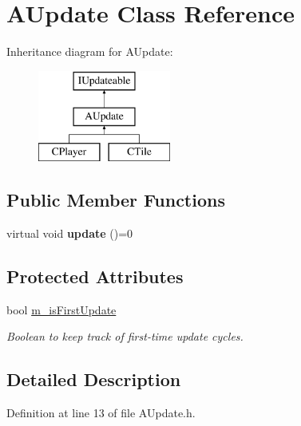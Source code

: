 \hypertarget{classAUpdate}{\section{A\-Update Class Reference}
\label{classAUpdate}
}
Inheritance diagram for A\-Update\-:\begin{figure}[H]
\begin{center}
\leavevmode
\includegraphics[height=3.000000cm]{classAUpdate}
\end{center}
\end{figure}
\subsection*{Public Member Functions}
\begin{DoxyCompactItemize}
\item 
\hypertarget{classAUpdate_a9f5be387e467fc5eea7fc45882abd949}{virtual void {\bfseries update} ()=0}\label{classAUpdate_a9f5be387e467fc5eea7fc45882abd949}

\end{DoxyCompactItemize}
\subsection*{Protected Attributes}
\begin{DoxyCompactItemize}
\item 
bool \hyperlink{classAUpdate_adf0a017c2fd5abd12f64f7f0fd992e66}{m\-\_\-is\-First\-Update}
\begin{DoxyCompactList}\small\item\em Boolean to keep track of first-\/time update cycles. \end{DoxyCompactList}\end{DoxyCompactItemize}


\subsection{Detailed Description}


Definition at line 13 of file A\-Update.\-h.




